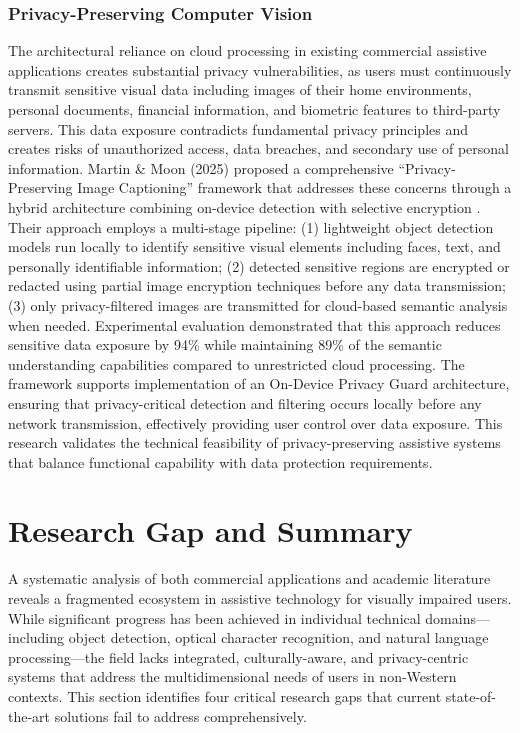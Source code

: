 \documentclass[a4paper]{report}
\begin{document}
\subsubsection{Privacy-Preserving Computer Vision}

The architectural reliance on cloud processing in existing commercial assistive applications creates substantial privacy vulnerabilities, as users must continuously transmit sensitive visual data including images of their home environments, personal documents, financial information, and biometric features to third-party servers. This data exposure contradicts fundamental privacy principles and creates risks of unauthorized access, data breaches, and secondary use of personal information. Martin \& Moon (2025) proposed a comprehensive ``Privacy-Preserving Image Captioning'' framework that addresses these concerns through a hybrid architecture combining on-device detection with selective encryption \cite{martin2025privacy}. Their approach employs a multi-stage pipeline: (1) lightweight object detection models run locally to identify sensitive visual elements including faces, text, and personally identifiable information; (2) detected sensitive regions are encrypted or redacted using partial image encryption techniques before any data transmission; (3) only privacy-filtered images are transmitted for cloud-based semantic analysis when needed. Experimental evaluation demonstrated that this approach reduces sensitive data exposure by 94\% while maintaining 89\% of the semantic understanding capabilities compared to unrestricted cloud processing. The framework supports implementation of an On-Device Privacy Guard architecture, ensuring that privacy-critical detection and filtering occurs locally before any network transmission, effectively providing user control over data exposure. This research validates the technical feasibility of privacy-preserving assistive systems that balance functional capability with data protection requirements.

\section{Research Gap and Summary}
\label{sec:research-gap}

A systematic analysis of both commercial applications and academic literature reveals a fragmented ecosystem in assistive technology for visually impaired users. While significant progress has been achieved in individual technical domains---including object detection, optical character recognition, and natural language processing---the field lacks integrated, culturally-aware, and privacy-centric systems that address the multidimensional needs of users in non-Western contexts. This section identifies four critical research gaps that current state-of-the-art solutions fail to address comprehensively.
\end{document}
